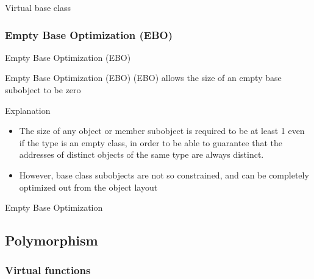 \begin{frame}{Virtual base class}{}
  \begin{example}
  \end{example}
\end{frame}



\subsubsection{Empty Base Optimization (EBO)}

\begin{frame}{Empty Base Optimization (EBO)}{}
  \begin{block}{Empty Base Optimization (EBO)}
     (EBO) allows the size of an empty base subobject to be zero
  \end{block}

  \begin{block}{Explanation}
    \begin{itemize}
    \item
      The size of any object or member subobject is required to be at least 1 even if the type is an empty class, in order to be able to guarantee that the addresses of distinct objects of the same type are always distinct.
    \item
      However, base class subobjects are not so constrained, and can be completely optimized out from the object layout
    \end{itemize}
  \end{block}
\end{frame}

\begin{frame}{Empty Base Optimization}{}
  \begin{example}
  \end{example}
\end{frame}


\subsection{Polymorphism}

\subsubsection{Virtual functions}

